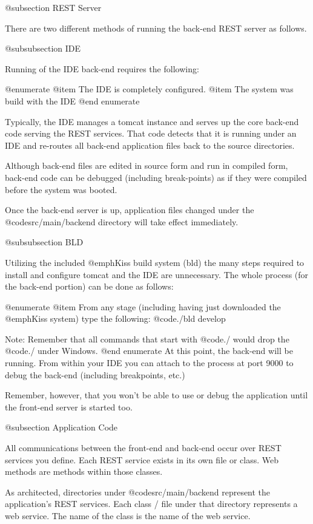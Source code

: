 @subsection REST Server

There are two different methods of running the back-end REST server as
follows.

@subsubsection IDE

Running of the IDE back-end requires the following:

@enumerate
@item
The IDE is completely configured.
@item
The system was build with the IDE
@end enumerate

Typically, the IDE manages a tomcat instance and serves up the core
back-end code serving the REST services.  That code detects that it is
running under an IDE and re-routes all back-end application files back
to the source directories.

Although back-end files are edited in source form and run in compiled
form, back-end code can be debugged (including break-points) as if
they were compiled before the system was booted.

Once the back-end server is up, application files changed under the
@code{src/main/backend} directory will take effect immediately.

@subsubsection BLD

Utilizing the included @emph{Kiss build system (bld)} the many steps required 
to install and configure tomcat and the IDE are unnecessary.  The whole process
(for the back-end portion) can be done as follows:

@enumerate
@item
From any stage (including having just downloaded the @emph{Kiss} system) type
the following:  @code{./bld develop}

Note:  Remember that all commands that start with @code{./} would drop
the @code{./} under Windows.
@end enumerate
At this point, the back-end will be running.  From within your IDE you
can attach to the process at port 9000 to debug the back-end (including
breakpoints, etc.)

Remember, however, that you won't be able to use or debug the application until
the front-end server is started too.

@subsection Application Code

All communications between the front-end and back-end occur over REST
services you define.  Each REST service exists in its own
file or class.  Web methods are methods within those classes.

As architected, directories under @code{src/main/backend}
represent the application's REST services.  Each class / file under that
directory represents a web service.  The name of the class is the name
of the web service.

